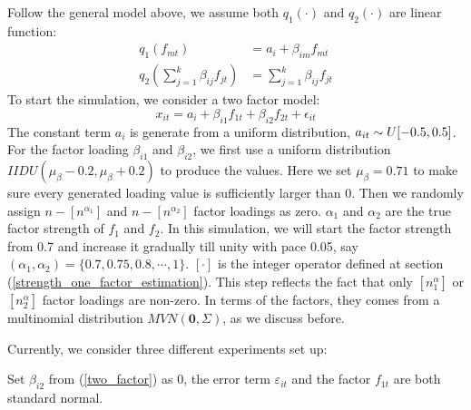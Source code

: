 Follow the general model above, we assume both $q_1(\cdot)$ and $q_2(\cdot)$ are linear function:
\begin{align*}
q_1({f_{mt}}) &= a_{i} +\beta_{im} f_{mt}\\
q_2(\sum_{j = 1}^{k}\beta_{ij}f_{jt}) &=\sum_{j = 1}^{k}\beta_{ij}f_{jt}
\end{align*}
To start the simulation, we consider a two factor model:
\[    x_{it} = a_{i} + \beta_{i1}f_{1t} + \beta_{i2}f_{2t}+\epsilon_{it} \tag{7} \label{two_factor}   \]
The constant term $a_{i}$ is generate from a uniform distribution, $a_{it} \sim \mathnormal{U}[-0.5,0.5]$.
For the factor loading $\beta_{i1}$ and $\beta_{i2}$, we first use a uniform distribution $IIDU(\mu_{\beta} - 0.2, \mu_{\beta}+0.2)$ to produce the values.
Here we set $\mu_{\beta}=0.71$ to make sure every generated loading value is sufficiently larger than 0.
Then we randomly assign $n - [n^{\alpha_{1}}]$ and $n - [n^{\alpha_{2}}]$ factor loadings as zero.
$\alpha_1$ and $\alpha_2$ are the true factor strength of $f_1$ and $f_2$. 
In this simulation, we will start the factor strength from 0.7 and increase it gradually till unity with pace 0.05, say $(\alpha_{1}, \alpha_{2}) = \{0.7, 0.75,0.8,\cdots,1\}$.
 $[\cdot]$ is the integer operator defined at section (\ref{strength_one_factor_estimation}).
This step reflects the fact that only $[n^\alpha_1]$ or $[n^\alpha_2]$ factor loadings are non-zero.
In terms of the factors, they comes from a multinomial distribution $MVN(\mathbf{0}, \Sigma) $, as we discuss before.

Currently, we consider three different experiments set up:

\begin{experiment}
Set $\beta_{i2}$ from (\ref{two_factor}) as 0, the error term $\varepsilon_{it}$ and the factor $f_{1t}$ are both standard normal.
\end{experiment}

